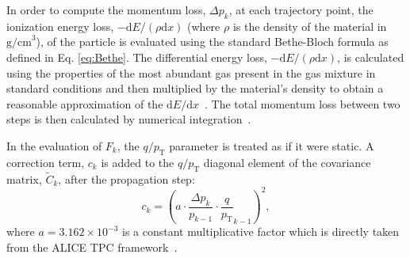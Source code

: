In order to compute the momentum loss, $\Delta p_k$, at each trajectory point, the ionization energy loss, $-\textrm{d}E/\left(\rho\textrm{d}x\right)$ (where $\rho$ is the density of the material in $\text{g/cm}^3$), of the particle is evaluated using the standard Bethe-Bloch formula as defined in Eq. \ref{eq:Bethe}.
The differential energy loss, $-\textrm{d}E/\left(\rho\textrm{d}x\right)$, is calculated using the properties of the most abundant gas present in the gas mixture in standard conditions and then multiplied by the material's density to obtain a reasonable approximation of the $\textrm{d}E/\textrm{d}x$~\cite{STERNHEIMER1984261}. The total momentum loss between two steps is then calculated by numerical integration~\cite{Griffiths2010}. 

In the evaluation of $F_k$, the $q/p_{\text{T}}$ parameter is treated as if it were static. A correction term, $c_k$ is added to the $q/p_{\text{T}}$ diagonal element of the covariance matrix, $\widetilde{C}_k$, after the propagation step:
\begin{equation} \label{eq:eloss-factor}
    c_k=\left(a\cdot\frac{\Delta p_k}{p_{k-1}} \cdot\frac{q}{p_{\text{T}}}_{k-1}\right)^2,
\end{equation}
where $a=3.162\times 10^{-3}$ is a constant multiplicative factor which is directly taken from the ALICE TPC framework~\cite{carminati2003simulation}.

